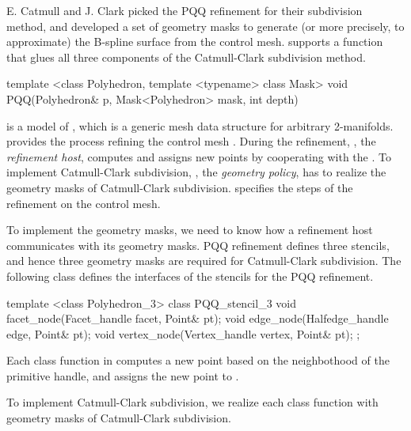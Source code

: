 E. Catmull and J. Clark picked the
PQQ refinement for their subdivision method,
and developed a set of geometry masks to generate (or more 
precisely, to approximate) the B-spline surface from 
the control mesh.
 supports a function that glues all 
three components of the Catmull-Clark subdivision method.

\begin{ccExampleCode}
template <class Polyhedron, template <typename> class Mask>
void PQQ(Polyhedron& p, Mask<Polyhedron> mask, int depth)
\end{ccExampleCode}

 is a model of , which
is a generic mesh data structure for arbitrary 
2-manifolds.  provides the process refining 
the control mesh . During the refinement, 
, the \emph{refinement host}, computes and assigns
new points by cooperating with the . 
To implement Catmull-Clark subdivision,
, the \emph{geometry policy}, has to realize the 
geometry masks of Catmull-Clark subdivision. 
 specifies the steps of the refinement 
on the control mesh. 

To implement the geometry masks, we need to know how  
a refinement host communicates with its geometry masks. 
PQQ refinement defines three stencils, and hence 
three geometry masks are required for Catmull-Clark subdivision.
The following class defines the interfaces of the stencils 
for the PQQ refinement.

\begin{ccExampleCode}
template <class Polyhedron_3>
class PQQ_stencil_3 {
  void facet_node(Facet_handle facet, Point& pt);
  void edge_node(Halfedge_handle edge, Point& pt);
  void vertex_node(Vertex_handle vertex, Point& pt);
};
\end{ccExampleCode}

Each class function in  
computes a new point based on the neighbothood of the primitive 
handle, and assigns the new point to . 

To implement Catmull-Clark subdivision, we realize each
class function with geometry masks of Catmull-Clark subdivision. 

